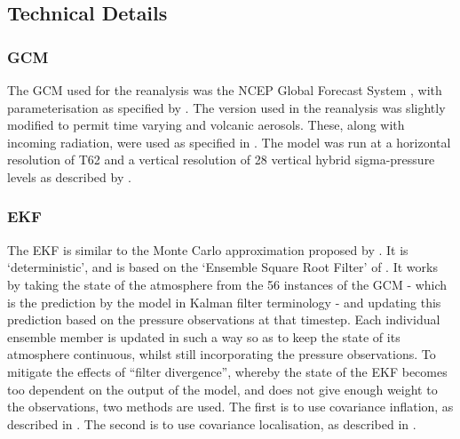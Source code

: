 \documentclass[pdftex,12pt,a4paper]{report}
\begin{document}

\subsection{Technical Details}
\label{sec:technical_details}

\subsubsection{GCM}
The GCM used for the reanalysis was the NCEP Global Forecast System
\parencite{kanamitsu1989description}, with
parameterisation as specified by \textcite{saha2006ncep}. The version used in the reanalysis was
slightly modified to permit time varying  and volcanic aerosols. These, along with incoming
radiation, were used as specified in \textcite{saha2010ncep}. The model was run at a horizontal
resolution of T62 and a vertical resolution of 28 vertical hybrid sigma-pressure levels as described
by \textcite{juang2005discrete}. 


\subsubsection{EKF}
The EKF is similar to the Monte Carlo approximation proposed by \textcite{evensen1994sequential,
evensen2003ensemble}. It is `deterministic', and is based on the `Ensemble Square Root Filter' of
\textcite{whitaker2002ensemble}. It works by taking the state of the atmosphere from the 56
instances of the GCM - which is the prediction by the model in Kalman filter terminology - and
updating this prediction based on the pressure observations at that timestep. Each individual
ensemble member is updated in such a way so as to keep the state of its atmosphere continuous,
whilst still incorporating the pressure observations. To mitigate the effects of ``filter
divergence'', whereby the state of the EKF becomes too dependent on the output of the model, and
does not give enough weight to the observations, two methods are used. The first is to use
covariance inflation, as described in \textcite{whitaker2004reanalysis}. The second is to use
covariance localisation, as described in \textcite{houtekamer2001sequential}. 
\end{document}

